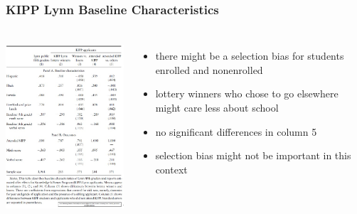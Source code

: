 \documentclass{beamer}
\begin{document}
\begin{frame}
\frametitle{KIPP Lynn Baseline Characteristics}

\begin{columns}
\includegraphics[width=6.5cm,height=6.5cm,keepaspectratio]{Table 3.1} 

\begin{itemize}
	\item there might be a selection bias for students enrolled and nonenrolled
	\item lottery winners who chose to go elsewhere might care less about school 
	\item no significant differences in column 5 
	\item selection bias might not be important in this context
\end{itemize}



\end{columns}
\end{frame}
\end{document}
